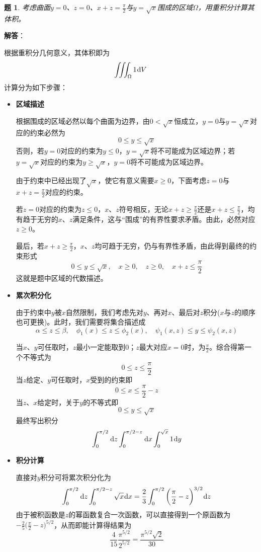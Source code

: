 \documentclass[a4paper,UTF8,fontset=windows,AutoFakeBold]{ctexart}
\newcommand*{\dr}{\hspace{0.07em}\mathrm{d}}
\theoremstyle{ex}
\newtheorem{exercise}{题}
\newcommand{\sol}[1]{{\vspace{5pt}\kaishu\noindent\textbf{解答}：\vspace{-3pt}
\begin{compactitem}
    \item[] #1
\end{compactitem}
}}
\begin{document}
\begin{framed}
\begin{exercise}\label{get ineq}
    考虑曲面$y=0$、$z=0$、$x+z=\frac{\pi}{2}$与$y=\sqrt{x}$围成的区域$\Omega$，用重积分计算其体积。
\end{exercise}
\sol{
    根据重积分几何意义，其体积即为
    $$\iiint_\Omega1\dr V$$
    计算分为如下步骤：
    \begin{itemize}
        \item \textbf{区域描述}
        
        根据围成的区域必然以每个曲面为边界，由$0<\sqrt{x}$恒成立，$y=0$与$y=\sqrt{x}$对应的约束必然为
        $$0\le y\le\sqrt{x}$$
        否则，若$y=0$对应的约束为$y\le0$，$y=\sqrt{x}$将不可能成为区域边界；若$y=\sqrt{x}$对应的约束为$y\ge\sqrt{x}$，$y=0$将不可能成为区域边界。

        由于约束中已经出现了$\sqrt{x}$，使它有意义需要$x\ge0$，下面考虑$z=0$与$x+z=\frac{\pi}{2}$对应的约束。

        若$z=0$对应的约束为$z\le0$，$x$、$z$符号相反，无论$x+z\ge\frac{\pi}{2}$还是$x+z\le\frac{\pi}{2}$，均有趋于无穷的$x$、$z$满足条件，这与``围成''的有界性要求矛盾。由此，必然对应$z\ge0$。

        最后，若$x+z\ge\frac{\pi}{2}$，$x$、$z$均可趋于无穷，仍与有界性矛盾，由此得到最终的约束形式
        $$0\le y\le\sqrt{x},\quad x\ge0,\quad z\ge0,\quad x+z\le\frac{\pi}{2}$$
        这就是题中区域的代数描述。

        \item \textbf{累次积分化}
            
        由于约束中$y$被$x$自然限制，我们考虑先对$y$、再对$x$、最后对$z$积分($x$与$z$的顺序也可更换)。此时，我们需要将集合描述成
        $$\alpha\le z\le\beta,\quad\phi_1(x)\le z\le\phi_2(x),\quad\psi_1(x,z)\le y\le\psi_2(x,z)$$

        当$x$、$y$可任取时，$z$最小一定能取到0；$z$最大对应$x=0$时，为$\frac{\pi}{2}$。综合得第一个不等式为
        $$0\le z\le\frac{\pi}{2}$$
        当$z$给定、$y$可任取时，$x$受到的约束即
        $$0\le x\le\frac{\pi}{2}-z$$
        当$z$、$x$给定时，关于$y$的不等式即
        $$0\le y\le\sqrt{x}$$
        最终写出积分
        $$\int_0^{\pi/2}\dr z\int_0^{\pi/2-z}\dr x\int_0^{\sqrt{x}}1\dr y$$

        \item \textbf{积分计算}
        
        直接对$y$积分可将累次积分化为
        $$\int_0^{\pi/2}\dr z\int_0^{\pi/2-z}\sqrt{x}\dr x=\frac{2}{3}\int_0^{\pi/2}\bigg(\frac{\pi}{2}-z\bigg)^{3/2}\dr z$$
        由于被积函数是$z$的幂函数复合一次函数，可以直接得到一个原函数为$-\frac{2}{5}\big(\frac{\pi}{2}-z\big)^{5/2}$，从而即能计算得结果为
        $$\frac{4}{15}\frac{\pi^{5/2}}{2^{5/2}}=\frac{\pi^{5/2}\sqrt2}{30}$$
    \end{itemize}
}
\end{framed}
\end{document}

